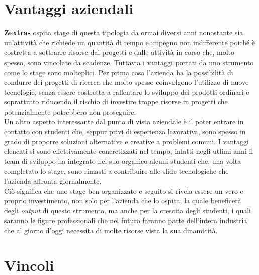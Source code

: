 \section{Vantaggi aziendali}
    \textbf{Zextras} ospita stage di questa tipologia da ormai diversi anni nonostante sia un'attività che richiede un quantità di tempo e impegno non indifferente poiché è costretta a sottrarre risorse dai progetti e dalle attività in corso che, molto spesso, sono vincolate da scadenze. Tuttavia i vantaggi portati da uno strumento come lo stage sono molteplici. Per prima cosa l'azienda ha la possibilità di condurre dei progetti di ricerca che molto spesso coinvolgono l'utilizzo di nuove tecnologie, senza essere costretta a rallentare lo sviluppo dei prodotti ordinari e soprattutto riducendo il rischio di investire troppe risorse in progetti che potenzialmente potrebbero non proseguire. \\
    Un altro aspetto interessante dal punto di vista aziendale è il poter entrare in contatto con studenti che, seppur privi di esperienza lavorativa, sono spesso in grado di proporre soluzioni alternative e creative a problemi comuni. I vantaggi elencati si sono effettivamente concretizzati nel tempo, infatti negli utlimi anni il team di sviluppo ha integrato nel suo organico alcuni studenti che, una volta completato lo stage, sono rimasti a contribuire alle sfide tecnologiche che l'azienda affronta giornalmente. \\
    Ciò significa che uno stage ben organizzato e seguito si rivela essere un vero e proprio investimento, non solo per l'azienda che lo ospita, la quale beneficerà degli \textit{output} di questo strumento, ma anche per la crescita degli studenti, i quali saranno le figure professionali che nel futuro faranno parte dell'intera industria che al giorno d'oggi necessita di molte risorse vista la sua dinamicità.

\newpage

\section{Vincoli}

